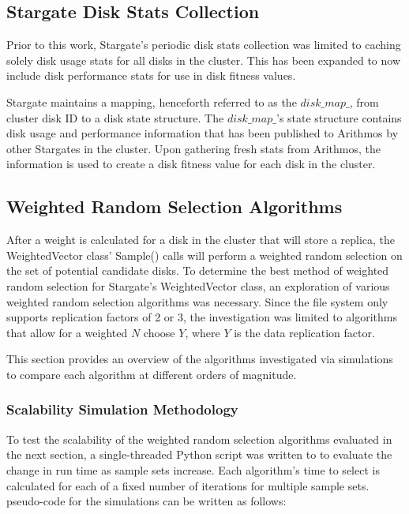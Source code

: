 \documentclass[12pt]{article}
\begin{document}
  \subsection{Stargate Disk Stats Collection}

  Prior to this work, Stargate's periodic disk stats collection was limited to
  caching solely disk usage stats for all disks in the cluster. This has been
  expanded to now include disk performance stats for use in disk fitness
  values.

  Stargate maintains a mapping, henceforth referred to as the $disk\_map\_$,
  from cluster disk ID to a disk state structure. The $disk\_map\_$'s state
  structure contains disk usage and performance information that has been
  published to Arithmos by other Stargates in the cluster. Upon gathering fresh
  stats from Arithmos, the information is used to create a disk fitness value
  for each disk in the cluster.

  \subsection{Weighted Random Selection Algorithms}

  After a weight is calculated for a disk in the cluster that will store a
  replica, the WeightedVector class' Sample() calls will perform a weighted
  random selection on the set of potential candidate disks. To determine the
  best method of weighted random selection for Stargate's WeightedVector class,
  an exploration of various weighted random selection algorithms was necessary.
  Since the file system only supports replication factors of 2 or 3, the
  investigation was limited to algorithms that allow for a weighted $N$ choose
  $Y$, where $Y$ is the data replication factor.

  This section provides an overview of the algorithms investigated via
  simulations to compare each algorithm at different orders of magnitude.

    \subsubsection{Scalability Simulation Methodology}
     To test the scalability of the weighted random selection algorithms
     evaluated in the next section, a single-threaded Python \cite{python}
     script was written to to evaluate the change in run time as sample sets
     increase. Each algorithm's time to select is calculated for each of a
     fixed number of iterations for multiple sample sets. pseudo-code for the
     simulations can be written as follows:
\end{document}

